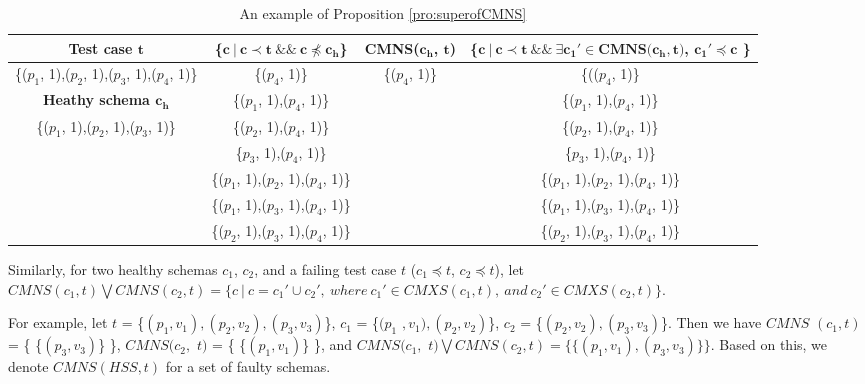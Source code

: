 {%
\begin{table}[ht]
  \centering
  \setlength{\tabcolsep}{3pt}
  \caption{An example of Proposition \ref{pro:superofCMNS}}
    \begin{tabular}{|c|c|c|c|}
    \hline
  \textbf{  Test case $\textbf{t}$} & \textbf{ \{$\textbf{c}\ |\ \textbf{c} \prec \textbf{t}\ \&\&\ \textbf{c} \npreceq \textbf{c}_{\textbf{h}}$\} }& \textbf{ CMNS($\textbf{c}_{\textbf{h}}$, $\textbf{t}$)} & \textbf{\{$ \textbf{c}\ |\ \textbf{c} \prec \textbf{t} \ \&\& \ \exists \textbf{c}_{\textbf{1}}' \in \textbf{CMNS}\textbf{(}\textbf{c}_{\textbf{h}}, \textbf{t}\textbf{)}$, $  \textbf{c}_{\textbf{1}}' \preceq \textbf{c}$ \}}\\\hline
    \{($p_{1}$, 1),($p_{2}$, 1),($p_{3}$, 1),($p_{4}$, 1)\}  & \{($p_{4}$, 1)\} & \{($p_{4}$, 1)\} & \{(($p_{4}$, 1)\}\\ \cline{1-1}
      \textbf{Heathy schema $\textbf{c}_{\textbf{h}}$}  & \{($p_{1}$, 1),($p_{4}$, 1)\} &  & \{($p_{1}$, 1),($p_{4}$, 1)\} \\\cline{1-1}
     \{($p_{1}$, 1),($p_{2}$, 1),($p_{3}$, 1)\}         &\{($p_{2}$, 1),($p_{4}$, 1)\}  &  & \{($p_{2}$, 1),($p_{4}$, 1)\}  \\
                         &\{$p_{3}$, 1),($p_{4}$, 1)\}   &  & \{$p_{3}$, 1),($p_{4}$, 1)\}  \\
                         &\{($p_{1}$, 1),($p_{2}$, 1),($p_{4}$, 1)\}   &  & \{($p_{1}$, 1),($p_{2}$, 1),($p_{4}$, 1)\}  \\
                         &\{($p_{1}$, 1),($p_{3}$, 1),($p_{4}$, 1)\}  &  & \{($p_{1}$, 1),($p_{3}$, 1),($p_{4}$, 1)\}  \\
                         &\{($p_{2}$, 1),($p_{3}$, 1),($p_{4}$, 1)\}  &  & \{($p_{2}$, 1),($p_{3}$, 1),($p_{4}$, 1)\}  \\ \hline
    \end{tabular}%
  \label{examleOfCMNSPro}%
\end{table}%


Similarly, for two healthy schemas $c_{1}$, $c_{2}$, and a failing test case $t$ ($c_{1} \preceq t$, $c_{2} \preceq t$), let $CMNS(c_{1}, t) \bigvee CMNS(c_{2}, t)  = \{ c\ |\ c = c_{1}' \cup c_{2}',\ where\ c_{1}' \in CMXS(c_{1}, t),\ and\ c_{2}' \in CMXS(c_{2}, t) \}$.

For example, let $t$ = \{$(p_{1},v_{1}), (p_{2}, v_{2}), (p_{3}, v_{3})$\}, $c_{1}$ = \{$(p_{1}$ $, v_{1}), (p_{2}, v_{2})$\}, $c_{2}$ = \{$(p_{2}, v_{2}), (p_{3}, v_{3})$\}. Then we have $CMNS$ $(c_{1}, t)$ = \{ \{$(p_{3}, v_{3})$\} \}, $CMNS(c_{2},$ $ t)$ = \{ \{$(p_{1}, v_{1})$\} \}, and  $CMNS(c_{1},$ $ t) \bigvee CMNS(c_{2}, t) = \{ \{(p_{1}, v_{1}), (p_{3}, v_{3})\} \} $. Based on this, we denote $CMNS(HSS,t)$ for a set of faulty schemas.


}
